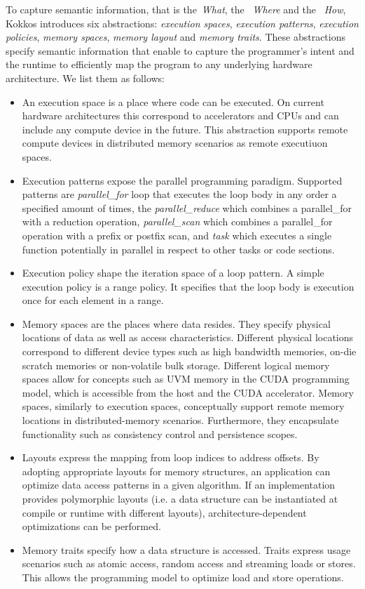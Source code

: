 To capture semantic information, that is the~\emph{What}, the ~\emph{Where} and the ~\emph{How}, Kokkos introduces six abstractions: \emph{execution spaces}, \emph{execution patterns}, \emph{execution policies}, \emph{memory spaces}, \emph{memory layout} and \emph{memory traits}. These abstractions specify semantic information that enable to capture the programmer's intent and the runtime to efficiently map the program to any underlying hardware architecture. We list them as follows:
\begin{itemize}
	\item  An execution space is a place where code can be executed. On current hardware architectures this correspond to accelerators and CPUs and can include any compute device in the future. This abstraction supports remote compute devices in distributed memory scenarios as remote executiuon spaces.
	\item Execution patterns expose the parallel programming paradigm. Supported patterns are \emph{parallel\_for} loop that executes the loop body in any order a specified amount of times, the \emph{parallel\_reduce} which combines a parallel\_for with a reduction operation, \emph{parallel\_scan} which combines a parallel\_for operation with a prefix or postfix scan, and \emph{task} which executes a single function potentially in parallel in respect to other tasks or code sections. 
	\item Execution policy shape the iteration space of a loop pattern. A simple execution policy is a range policy. It specifies that the loop body is execution once for each element in a range. 
	\item Memory spaces are the places where data resides. They specify physical locations of data as well as access characteristics. Different physical locations correspond to different device types such as high bandwidth memories, on-die scratch memories or non-volatile bulk storage. Different logical memory spaces allow for concepts such as UVM memory in the CUDA programming model, which is accessible from the host and the CUDA accelerator. Memory spaces, similarly to execution spaces, conceptually support remote memory locations in distributed-memory scenarios. Furthermore, they encapsulate functionality such as consistency control and persistence scopes.
	\item Layouts express the mapping from loop indices to address offsets. By adopting appropriate layouts for memory structures, an application can optimize data access patterns in a given algorithm. If an implementation provides polymorphic layouts (i.e. a data structure can be instantiated at compile or runtime with different layouts), architecture-dependent optimizations can be performed.
	\item Memory traits specify how a data structure is accessed. Traits express usage scenarios such as atomic access, random access and streaming loads or stores. This allows the programming model to  optimize load and store operations.
\end{itemize}



